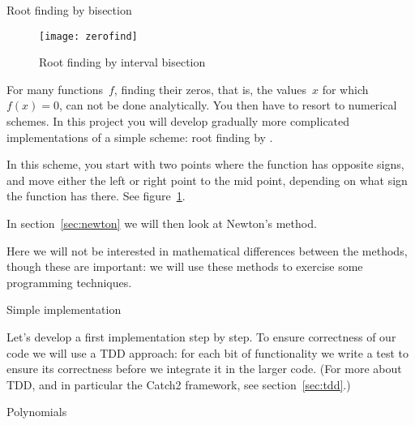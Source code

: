 
 {Root finding by bisection}
\label{sec:root-bisection}

\begin{figure}[ht]
  \texttt{[image: zerofind]}
  \caption{Root finding by interval bisection}
  \label{fig:zerofind}
\end{figure}

For many functions~$f$, finding their zeros, that is, the values~$x$
for which~$f(x)=0$, can not be done analytically. You then have to
resort to numerical  schemes.
In this project you will develop gradually more complicated
implementations of a simple scheme:
root finding by .

In this scheme, you start with two points where the function has opposite signs,
and move either the left or right point to the mid point,
depending on what sign the function has there.
See figure~\ref{fig:zerofind}.

In section~\ref{sec:newton} we will then look at Newton's method.

Here we will not be interested in mathematical differences between the methods,
though these are important:
we will use these methods to exercise some programming techniques.

 {Simple implementation}
\label{sec:rootfindarray}


Let's develop a first implementation step by step.
To ensure correctness of our code we will use a \acf{TDD} approach:
for each bit of functionality we write a test
to ensure its correctness before we integrate it in the larger code.
(For more about \ac{TDD}, and in particular the Catch2 framework,
see section~\ref{sec:tdd}.)

 {Polynomials}

